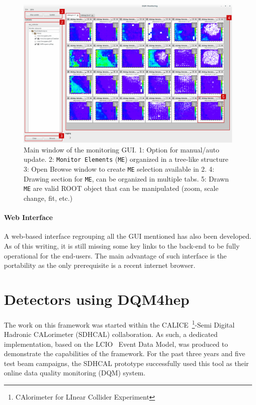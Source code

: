 \documentclass{webofc}
\begin{document}
\begin{figure}
  \centering
  \includegraphics[width=.95\textwidth]{figs/MaintInterfaceGUI.pdf}
    \caption{\label{fig:DQMMainViz} Main window of the monitoring GUI.
    1: Option for manual/auto update.
    2: \texttt{Monitor Elements} (\texttt{ME}) organized in a tree-like structure
    3: Open Browse window to create \texttt{ME} selection available in 2.
    4: Drawing section for \texttt{ME}, can be organized in multiple tabs.
    5: Drawn \texttt{ME} are valid ROOT object that can be manipulated (zoom, scale change, fit, etc.)
    }
\end{figure}

\paragraph{Web Interface}\label{par:WebGUI}
A web-based interface regrouping all the GUI mentioned has also been developed. As of this writing, it is still missing some key links to the back-end to be fully operational for the end-users. The main advantage of such interface is the portability as the only prerequisite is a recent internet browser.

\section{Detectors using DQM4hep}
\label{sec:detectors}

The work on this framework was started within the CALICE~\footnote{CAlorimeter for LInear Collider Experiment}-Semi Digital Hadronic CALorimeter (SDHCAL) collaboration.
As such, a dedicated implementation, based on the LCIO~\cite{LCIO} Event Data Model, was produced to demonstrate the capabilities of the framework.
For the past three years and five test beam campaigns, the SDHCAL prototype successfully used this tool as their online data quality monitoring (DQM) system.
\end{document}
